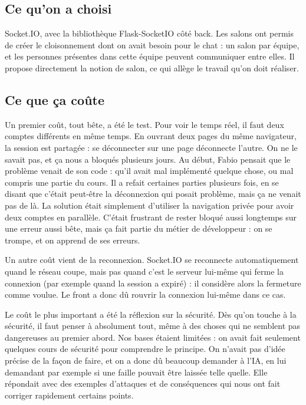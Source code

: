\documentclass[11pt,a4paper]{article}
\begin{document}
\subsection*{Ce qu'on a choisi}

Socket.IO, avec la bibliothèque Flask-SocketIO côté back. Les salons ont permis de créer le cloisonnement dont on avait besoin pour le chat : un salon par équipe, et les personnes présentes dans cette équipe peuvent communiquer entre elles. Il propose directement la notion de salon, ce qui allège le travail qu'on doit réaliser.

\subsection*{Ce que ça coûte}

Un premier coût, tout bête, a été le test. Pour voir le temps réel, il faut deux comptes différents en même temps. En ouvrant deux pages du même navigateur, la session est partagée : se déconnecter sur une page déconnecte l'autre. On ne le savait pas, et ça nous a bloqués plusieurs jours. Au début, Fabio pensait que le problème venait de son code : qu'il avait mal implémenté quelque chose, ou mal compris une partie du cours. Il a refait certaines parties plusieurs fois, en se disant que c'était peut-être la déconnexion qui posait problème, mais ça ne venait pas de là. La solution était simplement d'utiliser la navigation privée pour avoir deux comptes en parallèle. C'était frustrant de rester bloqué aussi longtemps sur une erreur aussi bête, mais ça fait partie du métier de développeur : on se trompe, et on apprend de ses erreurs.

Un autre coût vient de la reconnexion. Socket.IO se reconnecte automatiquement quand le réseau coupe, mais pas quand c'est le serveur lui-même qui ferme la connexion (par exemple quand la session a expiré) : il considère alors la fermeture comme voulue. Le front a donc dû rouvrir la connexion lui-même dans ce cas.

Le coût le plus important a été la réflexion sur la sécurité. Dès qu'on touche à la sécurité, il faut penser à absolument tout, même à des choses qui ne semblent pas dangereuses au premier abord. Nos bases étaient limitées : on avait fait seulement quelques cours de sécurité pour comprendre le principe. On n'avait pas d'idée précise de la façon de faire, et on a donc dû beaucoup demander à l'IA, en lui demandant par exemple si une faille pouvait être laissée telle quelle. Elle répondait avec des exemples d'attaques et de conséquences qui nous ont fait corriger rapidement certains points.
\end{document}
